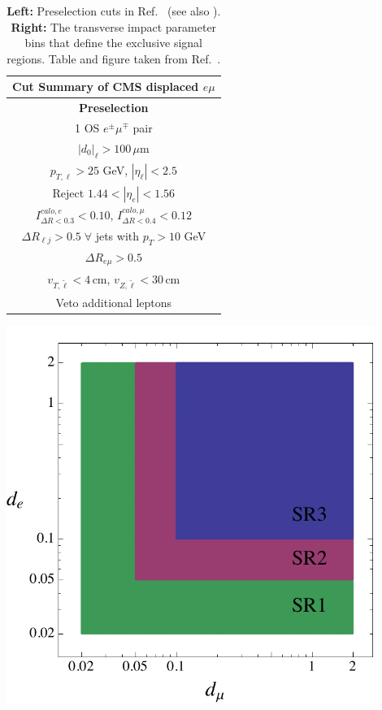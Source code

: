 \begin{table}[t]%
\centering
\parbox{0.4\textwidth}{
\begin{footnotesize}
\begin{tabular}{| c |} \hline
{\bf Cut Summary of CMS displaced $e\mu$}    \\ \hline \hline
{\bf Preselection}    \\ \hline
{1 OS $e^\pm\mu^\mp$ pair} \\
{$|d_0|_\ell>100\,\mu$m} \\
{$p_{T,\ell}>25$ GeV,  $ \left\vert \eta_\ell \right\vert <2.5$} \\
{Reject $1.44 <  \left\vert \eta_e \right\vert<1.56$} \\
{$I^{calo,e}_{\Delta R<0.3}<0.10$}, {$I^{calo,\mu}_{\Delta R<0.4}<0.12$} \\
{ $\Delta R_{\ell j}>0.5\; \forall$ jets with $p_T>10$ GeV } \\
{$\Delta R_{e\mu}>0.5$} \\
{$v_{T,\tilde \ell} < 4 \,\mbox{cm}$, $ v_{Z,\tilde \ell} <  30 \,\mbox{cm}$}\\
{Veto additional leptons} \\
 \hline
\end{tabular}
\end{footnotesize}
}
\qquad
\begin{minipage}[c]{0.45\textwidth}%
\centering
    \includegraphics[width=0.9\textwidth,angle=0]{ch5-figures/SRplot.pdf}
\label{tab:cuts}

\end{minipage}
\caption{{\bf Left:} Preselection cuts in Ref.~\cite{Khachatryan:2014mea} (see also \cite{CMS:2014bra,CMSemuEfficiency}). {\bf Right:} The transverse impact parameter bins that define the exclusive signal regions. Table and figure taken from Ref.~\cite{Evans:2016zau}.
  \label{tab:cuts}}
\end{table}


